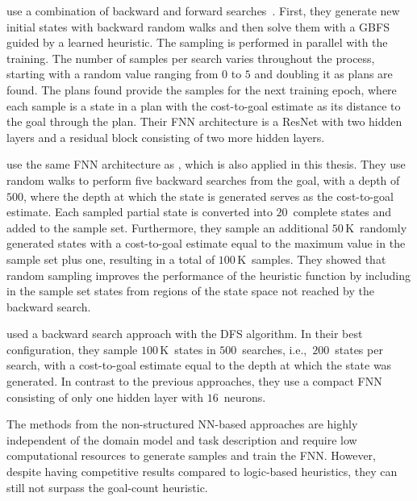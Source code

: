 \citet{ferber2022neural} use a combination of backward and forward searches~\cite{arfaee2011learning}. First, they generate new initial states with backward random walks and then solve them with a GBFS guided by a learned heuristic. The sampling is performed in parallel with the training. The number of samples per search varies throughout the process, starting with a random value ranging from $0$ to $5$ and doubling it as plans are found. The plans found provide the samples for the next training epoch, where each sample is a state in a plan with the cost-to-goal estimate as its distance to the goal through the plan. Their FNN architecture is a ResNet with two hidden layers and a residual block consisting of two more hidden layers.

\citet{otoole2022sampling} use the same FNN architecture as \citet{ferber2022neural}, which is also applied in this thesis. They use random walks to perform five backward searches from the goal, with a depth of~$500$, where the depth at which the state is generated serves as the cost-to-goal estimate. Each sampled partial state is converted into $20$~complete states and added to the sample set. Furthermore, they sample an additional $50$\,K~randomly generated states with a cost-to-goal estimate equal to the maximum value in the sample set plus one, resulting in a total of $100$\,K~samples. They showed that random sampling improves the performance of the heuristic function by including in the sample set states from regions of the state space not reached by the backward search.

\citet{yu2020learning} used a backward search approach with the DFS algorithm. In their best configuration, they sample $100$\,K~states in $500$~searches, i.e.,~$200$~states per search, with a cost-to-goal estimate equal to the depth at which the state was generated. In contrast to the previous approaches, they use a compact FNN consisting of only one hidden layer with $16$~neurons.

The methods from the non-structured NN-based approaches are highly independent of the domain model and task description and require low computational resources to generate samples and train the FNN. However, despite having competitive results compared to logic-based heuristics, they can still not surpass the goal-count heuristic.
